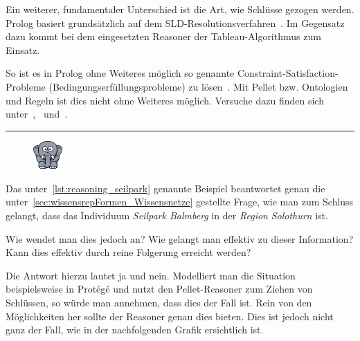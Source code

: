 Ein weiterer, fundamentaler Unterschied ist die Art, wie Schlüsse gezogen werden. Prolog basiert grundsätzlich auf dem SLD-Resolutionsverfahren~\citep[Details siehe][Seite 68]{laemmel}. Im Gegensatz dazu kommt bei dem eingesetzten Reasoner der Tableau-Algorithmus zum Einsatz.

So ist es in Prolog ohne Weiteres möglich so genannte Constraint-Satisfaction-Probleme (Bedingungserfüllungsprobleme) zu lösen~\citep[Details siehe][Seite 148]{laemmel}. Mit Pellet bzw. Ontologien und Regeln ist dies nicht ohne Weiteres möglich. Versuche dazu finden sich unter~\citet{xiong2008constraint},~\citet{staab2006constraint} und~\citet{bramer2007constraint}.

\noindent\rule[1ex]{\textwidth}{1pt}
\begin{figure}
    \vspace{-12pt}
    \includegraphics[width=0.1\textwidth]{bilder/elephant.png}
\end{figure}
Das unter~\ref{lst:reasoning_seilpark} genannte Beispiel beantwortet genau die unter~\ref{sec:wissensrepFormen_Wissensnetze} gestellte Frage, wie man zum Schluss gelangt, dass das Individuum \textit{Seilpark Balmberg} in der \textit{Region} \textit{Solothurn} ist.

Wie wendet man dies jedoch an? Wie gelangt man effektiv zu dieser Information? Kann dies effektiv durch reine Folgerung erreicht werden?

Die Antwort hierzu lautet ja und nein. Modelliert man die Situation beispielsweise in Protégé und nutzt den Pellet-Reasoner zum Ziehen von Schlüssen, so würde man annehmen, dass dies der Fall ist. Rein von den Möglichkeiten her sollte der Reasoner genau dies bieten. Dies ist jedoch nicht ganz der Fall, wie in der nachfolgenden Grafik ersichtlich ist.

